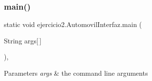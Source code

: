 \subsubsection{\texorpdfstring{main()}{main()}}
{\footnotesize\ttfamily static void ejercicio2.\+Automovil\+Interfaz.\+main (\begin{DoxyParamCaption}\item[{String}]{args\mbox{[}$\,$\mbox{]} }\end{DoxyParamCaption})\hspace{0.3cm}{\ttfamily [inline]}, {\ttfamily [static]}}


\begin{DoxyParams}{Parameters}
{\em args} & the command line arguments \\
\hline
\end{DoxyParams}

